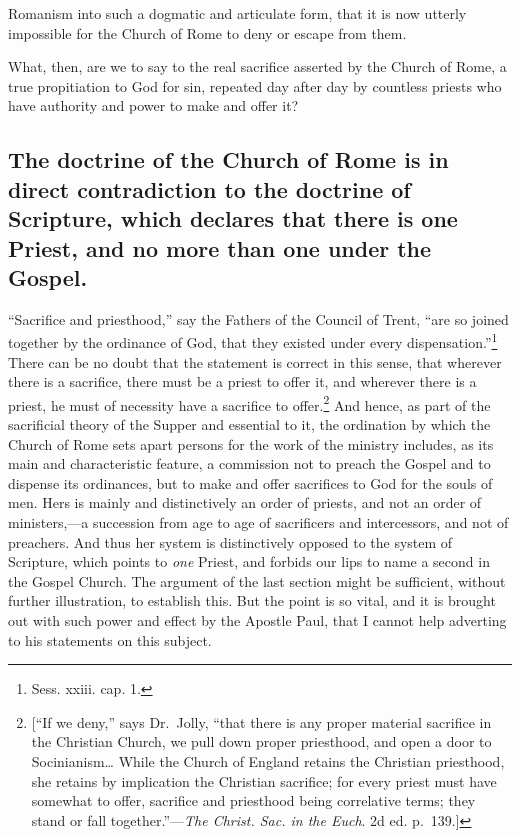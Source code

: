 \documentclass[english,]{book}
\begin{document}
Romanism into such a dogmatic and articulate form, that it is now utterly impossible for the Church of Rome to deny or escape from them.

What, then, are we to say to the real sacrifice asserted by the Church of Rome, a true propitiation to God for sin, repeated day after day by countless priests who have authority and power to make and offer it?

\hypertarget{the-doctrine-of-the-church-of-rome-is-in-direct-contradiction-to-the-doctrine-of-scripture-which-declares-that-there-is-one-priest-and-no-more-than-one-under-the-gospel.}{%
\subsection{The doctrine of the Church of Rome is in direct contradiction to the doctrine of Scripture, which declares that there is one Priest, and no more than one under the Gospel.}\label{the-doctrine-of-the-church-of-rome-is-in-direct-contradiction-to-the-doctrine-of-scripture-which-declares-that-there-is-one-priest-and-no-more-than-one-under-the-gospel.}}

``Sacrifice and priesthood,'' say the Fathers of the Council of Trent, ``are so joined together by the ordinance of God, that they existed under every dispensation.''\footnote{Sess. xxiii. cap. 1.} There can be no doubt that the statement is correct in this sense, that wherever there is a sacrifice, there must be a priest to offer it, and wherever there is a priest, he must of necessity have a sacrifice to offer.\footnote{{[}``If we deny,'' says Dr.~Jolly, ``that there is any proper material sacrifice in the Christian Church, we pull down proper priesthood, and open a door to Socinianism\ldots{} While the Church of England retains the Christian priesthood, she retains by implication the Christian sacrifice; for every priest must have somewhat to offer, sacrifice and priesthood being correlative terms; they stand or fall together.''---\emph{The Christ. Sac. in the Euch}. 2d ed. p.~139.{]}} And hence, as part of the sacrificial theory of the Supper and essential to it, the ordination by which the Church of Rome sets apart persons for the work of the ministry includes, as its main and characteristic feature, a commission not to preach the Gospel and to dispense its ordinances, but to make and offer sacrifices to God for the souls of men. Hers is mainly and distinctively an order of priests, and not an order of ministers,---a succession from age to age of sacrificers and intercessors, and not of preachers. And thus her system is distinctively opposed to the system of Scripture, which points to \emph{one} Priest, and forbids our lips to name a second in the Gospel Church. The argument of the last section might be sufficient, without further illustration, to establish this. But the point is so vital, and it is brought out with such power and effect by the Apostle Paul, that I cannot help adverting to his statements on this subject.
\end{document}
